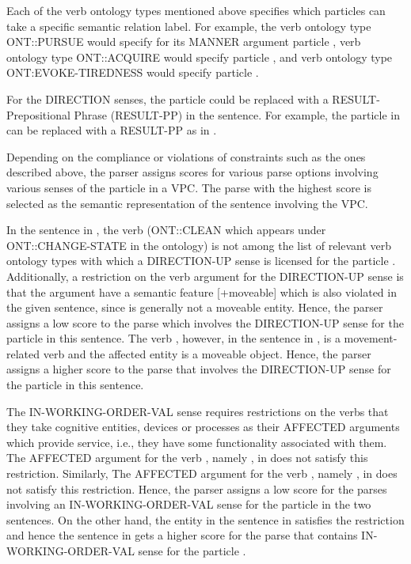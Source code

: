 \documentclass[output=paper
,modfonts
,nonflat]{langsci/langscibook}
\begin{document}
Each of the verb ontology types mentioned above specifies which particles can take a specific semantic relation label. For example, the verb ontology type ONT::PURSUE would specify for its MANNER argument particle , verb ontology type ONT::ACQUIRE would specify particle , and verb ontology type ONT:EVOKE-TIREDNESS would specify particle .  

For the DIRECTION senses, the particle could be replaced with a RESULT-Pre\-po\-si\-tional Phrase (RESULT-PP) in the sentence. For example, the particle  in  can be replaced with a RESULT-PP  as in .

Depending on the compliance or violations of constraints such as the ones described above, the parser assigns scores for various parse options involving various senses of the particle in a VPC. The parse with the highest score is selected as the semantic representation of the sentence involving the VPC.

In the sentence  in , the verb  (ONT::CLEAN which appears under ONT::CHANGE-STATE in the ontology) is not among the list of relevant verb ontology types with which a DIRECTION-UP sense is licensed for the particle . Additionally, a restriction on the verb argument for the DIRECTION-UP sense is that the argument have a semantic feature [+moveable] which is also violated in the given sentence, since  is generally not a moveable entity. Hence, the parser assigns a low score to the parse which involves the DIRECTION-UP sense for the particle  in this sentence. The verb , however, in the sentence in , is a movement-related verb and the affected entity  is a moveable object. Hence, the parser assigns a higher score to the parse that involves the DIRECTION-UP sense for the particle  in this sentence.

The IN-WORKING-ORDER-VAL sense requires restrictions on the verbs that they take cognitive entities, devices or processes as their AFFECTED arguments which provide service, i.e., they have some functionality associated with them. The AFFECTED argument for the verb , namely , in  does not satisfy this restriction. Similarly, The AFFECTED argument for the verb , namely , in  does not satisfy this restriction. Hence, the parser assigns a low score for the parses involving an IN-WORKING-ORDER-VAL sense for the particle  in the two sentences. On the other hand, the entity  in the sentence in  satisfies the restriction and hence the sentence in  gets a higher score for the parse that contains IN-WORKING-ORDER-VAL sense for the particle . 
\end{document}

